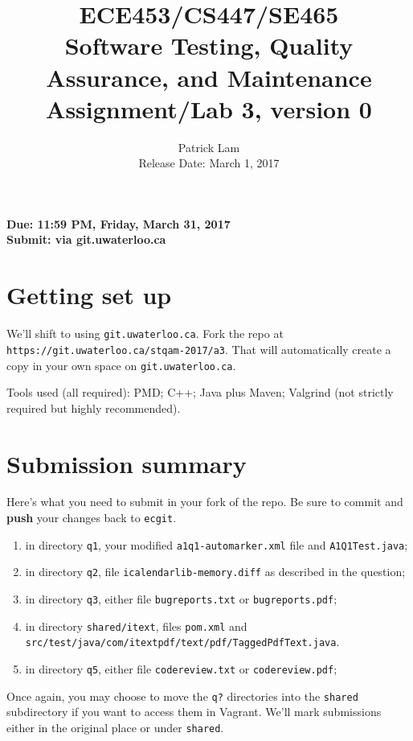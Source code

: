 \documentclass[10pt,hidelinks]{article}
\begin{document}
\title{
ECE453/CS447/SE465 \\
Software Testing, Quality Assurance, and Maintenance\\
Assignment/Lab 3, version 0}
\author{Patrick Lam \\
{Release Date: March 1, 2017} \\
}
\renewcommand{\today}{}
\maketitle

\begin{center}

{\bf Due:  11:59 PM, Friday, March 31, 2017} \\
{\bf Submit: via git.uwaterloo.ca }\\
\end{center}

\section*{Getting set up}
We'll shift to using {\tt git.uwaterloo.ca}. Fork the repo at 
{\tt https://git.uwaterloo.ca/stqam-2017/a3}. That will automatically create a copy in your own space
on {\tt git.uwaterloo.ca}.

Tools used (all required): PMD; C++; Java plus Maven; Valgrind (not
strictly required but highly recommended).

\section*{Submission summary}
Here's what you need to submit in your fork of the repo. Be sure to commit
and {\bf push} your changes back to {\tt ecgit}.
\begin{enumerate}
\item in directory {\tt q1}, your modified {\tt a1q1-automarker.xml} file and {\tt A1Q1Test.java};
\item in directory {\tt q2}, file {\tt icalendarlib-memory.diff} as described in the question;
\item in directory {\tt q3}, either file {\tt bugreports.txt} or {\tt bugreports.pdf};
\item in directory {\tt shared/itext}, files {\tt pom.xml} and {\tt src/test/java/com/itextpdf/text/pdf/TaggedPdfText.java}.
\item in directory {\tt q5}, either file {\tt codereview.txt} or {\tt codereview.pdf};
\end{enumerate}
Once again, you may choose to move the {\tt q?} directories into the {\tt shared} subdirectory if you want to access them in Vagrant. We'll mark submissions either in the original place or under {\tt shared}.
\end{document}
